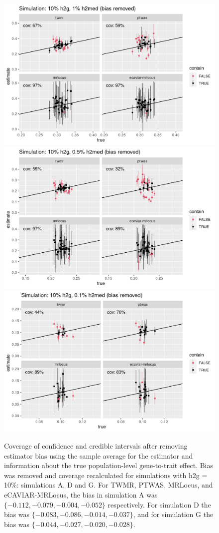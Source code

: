\documentclass[11pt]{article}
\begin{document}
\begin{figure}[!ht]
  \centering
  \includegraphics[width=.49\textwidth]{figs/cover1_minus_bias.png} 
  \includegraphics[width=.49\textwidth]{figs/cover4_minus_bias.png} \\
  \includegraphics[width=.49\textwidth]{figs/cover5_minus_bias.png}
  \caption{Coverage of confidence and credible intervals after
    removing estimator bias using the sample average for the estimator
    and information about the true population-level gene-to-trait
    effect. Bias was removed and coverage recalculated for simulations
    with h2g = 10\%: simulations A, D and G. For TWMR, PTWAS, MRLocus,
    and eCAVIAR-MRLocus, the bias in simulation A was
    $\{-0.112, -0.079, -0.004, -0.052\}$ respectively.
    For simulation D the bias was
    $\{-0.083, -0.086, -0.014, -0.037\}$,
    and for simulation G the bias was
    $\{-0.044, -0.027, -0.020, -0.028\}$.}
\end{figure}
\end{document}
